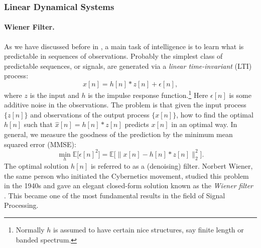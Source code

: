 \documentclass[../../book-main.tex]{subfiles}
\begin{document}
\subsubsection{Linear Dynamical Systems}
\label{sec:linear-systems}

\paragraph{Wiener Filter.}

As we have discussed before in , a main task of intelligence is to learn what is predictable in sequences of observations. Probably the simplest class of predictable sequences, or signals, are generated via a {\em linear time-invariant} (LTI) process:
\begin{equation}
    x[n] = h[n]*z[n] + \epsilon[n], 
    \label{eqn:Wiener-model}
\end{equation}
where $z$ is the input and $h$ is the impulse response function.\footnote{Normally $h$ is assumed to have certain nice structures, say finite length or banded spectrum.}  Here $\epsilon[n]$ is some additive noise in the observations. The problem is that given the input process $\{z[n]\}$ and observations of the output process $\{x[n]\}$, how to find the optimal $h[n]$ such that $\hat x[n] = h[n]*z[n]$ predicts $x[n]$ in an optimal way. In general, we measure the goodness of the prediction by the minimum mean squared error (MMSE):
\begin{equation}
    \min_{h} \mathbb{E} \big[\epsilon[n]^2\big] = \mathbb{E} \big[\|x[n] - h[n]*z[n]\|_2^2\big].
\end{equation}
The optimal solution $h[n]$ is referred to as a (denoising) filter. Norbert Wiener, the same person who initiated the Cybernetics movement, studied this problem in the 1940s and gave an elegant closed-form solution known as the {\em Wiener filter} \cite{Wiener-1942,Wiener-1949}. This became one of the most fundamental results in the field of  Signal Processing.
\end{document}
